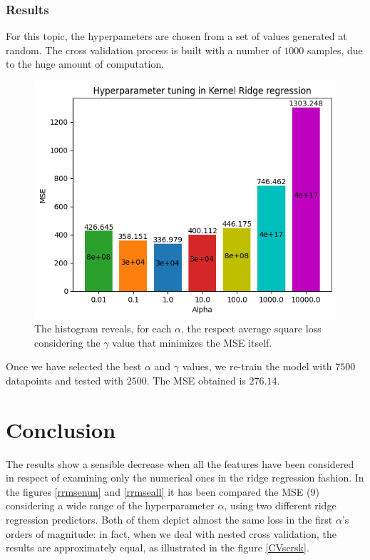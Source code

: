 \documentclass{article}
\begin{document}
\subsubsection{Results}
For this topic, the hyperpameters are chosen from a set of values generated at random. The cross validation process is built with a number of $1000$ samples, due to the huge amount of computation. 
\begin{figure}[H]
	\begin{adjustwidth}{0 cm}{}
		\begin{center}
			\includegraphics[scale= 0.7]{images/hyptuningKRR.png}
		\end{center}
	\end{adjustwidth}
	\caption{The histogram reveals, for each $\alpha$, the respect average square loss considering the $\gamma$ value that minimizes the MSE itself.}
	\label{hyptuningKRR}
\end{figure}
    
Once we have selected the best $\alpha$ and $\gamma$ values, we re-train the model with $7500$ datapoints and tested with $2500$. The MSE obtained is $276.14$. 

\section{Conclusion}
The results show a sensible decrease when all the features have been considered in respect of examining only the numerical ones in the ridge regression fashion. In the figures \ref{rrmsenun} and \ref{rrmseall} it has been compared the MSE (9) considering a wide range of the hyperparameter $\alpha$, using two different ridge regression predictors. Both of them depict almost the same loss in the first $\alpha$'s orders of magnitude: in fact, when we deal with nested cross validation, the results are approximately equal, as illustrated in the figure \ref{CVscrsk}.   
\end{document}
